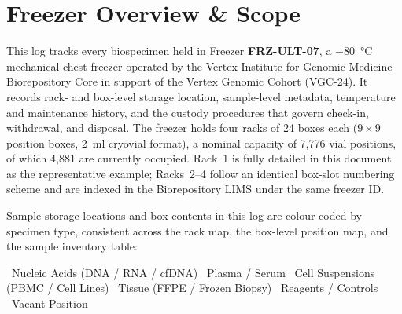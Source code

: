 \section{Freezer Overview \& Scope}
\label{sec:overview}

This log tracks every biospecimen held in Freezer \textbf{FRZ-ULT-07}, a \SI{-80}{\celsius}
mechanical chest freezer operated by the Vertex Institute for Genomic Medicine Biorepository
Core in support of the Vertex Genomic Cohort (VGC-24). It records rack- and box-level storage
location, sample-level metadata, temperature and maintenance history, and the custody
procedures that govern check-in, withdrawal, and disposal. The freezer holds four racks of
24 boxes each ($9\times9$ position boxes, \SI{2}{\milli\litre} cryovial format), a nominal
capacity of 7{,}776 vial positions, of which 4{,}881 are currently occupied. Rack~1 is fully
detailed in this document as the representative example; Racks~2--4 follow an identical
box-slot numbering scheme and are indexed in the Biorepository LIMS under the same freezer ID.

Sample storage locations and box contents in this log are colour-coded by specimen type,
consistent across the rack map, the box-level position map, and the sample inventory table:

\begin{center}
\small
{}\ Nucleic Acids (DNA / RNA / cfDNA) \qquad
{}\ Plasma / Serum \qquad
{}\ Cell Suspensions (PBMC / Cell Lines) \qquad
{}\ Tissue (FFPE / Frozen Biopsy) \qquad
{}\ Reagents / Controls \qquad
{}\ Vacant Position
\end{center}


